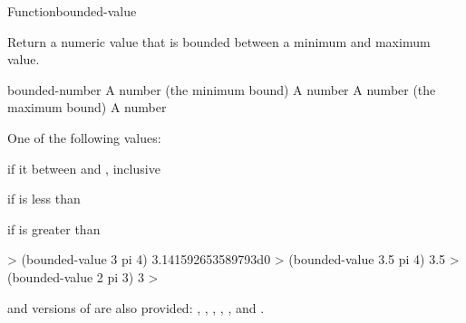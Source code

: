 \documentclass[10pt,twoside,english,pdftex]{article}
\begin{document}
\begin{functiondoc}{Function}{bounded-value}{
  \returns{} }
%

\fnsyntax

\fnpurpose Return a numeric value that is bounded between a minimum
and maximum value.

\fnpackage {}

\fnmodule {}

\fnargs
\begin{args}{bounded-number}
\arg[min] A number (the minimum bound)
\arg[number] A number
\arg[max] A number (the maximum bound)
 A number
\end{args}

\fnreturns One of the following values:
\begin{tightitemize}
\item {} if it between  and , inclusive
\item {} if  is less than 
\item {} if  is greater than 
\end{tightitemize}

\fnexamples
\begin{example}
%
\W\supp
  > (bounded-value 3 pi 4)
  3.141592653589793d0
  > (bounded-value 3.5 pi 4)
  3.5
  > (bounded-value 2 pi 3)
  3
  >
\end{example}

\fnnote
%
%
%
%
%
%
%
%
 and  versions of  are also
provided: , ,
, ,
, and .

\end{functiondoc}

\end{document}
